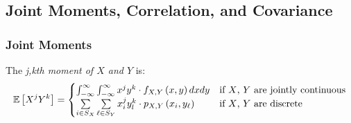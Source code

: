 \subsection{Joint Moments, Correlation, and Covariance}\label{subsec:Joint Moments, Correlation, and Covariance}
\subsubsection{Joint Moments}\label{subsubsec:Joint Moments}
\begin{definition}\label{def:jkth Moment}
  The \emph{j,kth moment of $X$ and $Y$} is:
  \begin{equation}\label{eq:jkth Moment}
    \operatorname{\operatorname{\mathbb{E}}} \left[ X^{j} Y^{k} \right] =
    \begin{cases}
      \int_{-\infty}^{\infty} \int_{-\infty}^{\infty} x^{j} y^{k} \cdot f_{X,Y} \left( x,y \right) dx dy &
      \text{if $X$, $Y$ are jointly continuous} \\
      \sum\limits_{i \in S_{X}} \sum\limits_{\ell \in S_{Y}} x_{i}^{j} y_{l}^{k} \cdot p_{X,Y} \left( x_{i},y_{\ell} \right) &
      \text{if $X$, $Y$ are discrete} \\
    \end{cases}
  \end{equation}
\end{definition}

